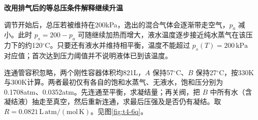 \begin{solution}
\par\medskip{}\noindent\textbf{改用排气后的等总压条件解释继续升温}\par\nobreak
调节开始后，总压若被维持在200kPa，逸出的混合气体会逐渐带走空气，$p_a$ 减小。此时 $p_s=200-p_a$ 可随继续加热而增大，液水温度逐步接近纯水蒸气在该压力下的约120$^\circ$C。只要还有液水并维持相平衡，温度不能超过 $p_s(T)=200\,\mathrm{kPa}$ 对应值；首次达到压力阈值并不说明液体已到该温度。
\end{solution}
\par\medskip\noindent\begin{minipage}{\textwidth}
\begin{example}[冷热两容器与二次连通]\label{t4-6}
连通管容积忽略，两个刚性容器体积均821L，$A$ 保持57$^\circ$C、$B$ 保持27$^\circ$C，按330K与300K计算。两者最初仅有各自的饱和水蒸气、无液水，饱和压分别为0.1708atm、0.0352atm。先连通至平衡，求凝结量；再关阀，把 $B$ 中所有水（含凝结液）抽走至真空，然后重新连通，求最后压强及是否仍有凝结。取 $R=0.0821\,\mathrm{L\,atm/(mol\,K)}$。见图\ref{fig:t4-6q}。
\end{example}
\end{minipage}
